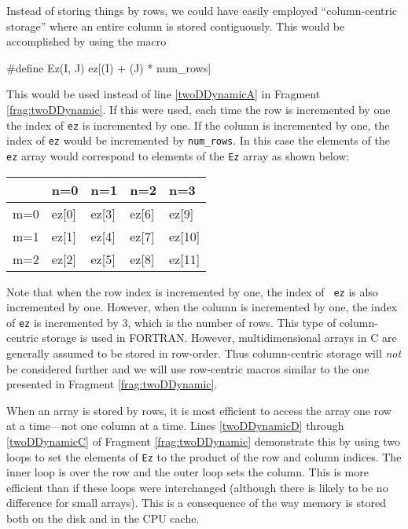 Instead of storing things by rows, we could have easily employed
``column-centric storage'' where an entire column is stored contiguously.
This would be accomplished by using the macro
\begin{code}
  #define Ez(I, J)   ez[(I) + (J) * num_rows]
\end{code}
This would be used instead of line \ref{twoDDynamicA} in Fragment
\ref{frag:twoDDynamic}.  If this were used, each time the row is
incremented by one the index of {\tt ez} is incremented by one.  If
the column is incremented by one, the index of {\tt ez} would be
incremented by {\tt num\_rows}.  In this case the elements of the {\tt
ez} array would correspond to elements of the {\tt Ez} array as shown
below:
\begin{center}
\begin{tabular}{l|llll}
    &n=0     & n=1     & n=2     & n=3     \\ \hline
m=0 &ez[0]   & ez[3]   & ez[6]   & ez[9] \\
m=1 &ez[1]   & ez[4]   & ez[7]   & ez[10] \\
m=2 &ez[2]   & ez[5]   & ez[8]   & ez[11]
\end{tabular}
\end{center}
Note that when the row index is incremented by one, the index of {\tt
  ez} is also incremented by one.  However, when the column is
incremented by one, the index of {\tt ez} is incremented by $3$, which
is the number of rows.  This type of column-centric storage is used in
FORTRAN.  However, multidimensional arrays in C are generally assumed
to be stored in row-order.  Thus column-centric storage will {\em not}
be considered further and we will use row-centric macros similar to
the one presented in Fragment \ref{frag:twoDDynamic}.

When an array is stored by rows, it is most efficient to access the
array one row at a time---not one column at a time.  Lines
\ref{twoDDynamicD} through \ref{twoDDynamicC} of Fragment
\ref{frag:twoDDynamic} demonstrate this by using two loops to set the
elements of {\tt Ez} to the product of the row and column indices.
The inner loop is over the row and the outer loop sets the column.
This is more efficient than if these loops were interchanged (although
there is likely to be no difference for small arrays).  This is a
consequence of the way memory is stored both on the disk and in the
CPU cache.  

